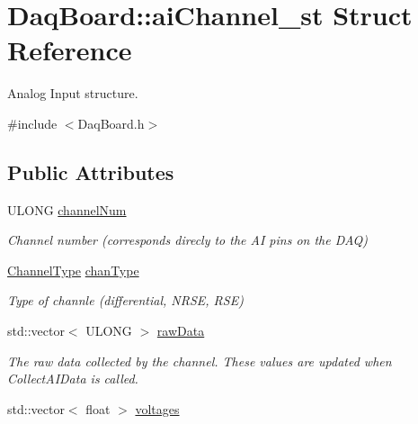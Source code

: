 \hypertarget{struct_daq_board_1_1ai_channel__st}{\section{Daq\-Board\-:\-:ai\-Channel\-\_\-st Struct Reference}
\label{struct_daq_board_1_1ai_channel__st}
}


Analog Input structure.  




{\ttfamily \#include $<$Daq\-Board.\-h$>$}

\subsection*{Public Attributes}
\begin{DoxyCompactItemize}
\item 
\hypertarget{struct_daq_board_1_1ai_channel__st_ad49169dabc4da0237e51d6b77d1844d1}{U\-L\-O\-N\-G \hyperlink{struct_daq_board_1_1ai_channel__st_ad49169dabc4da0237e51d6b77d1844d1}{channel\-Num}}\label{struct_daq_board_1_1ai_channel__st_ad49169dabc4da0237e51d6b77d1844d1}

\begin{DoxyCompactList}\small\item\em Channel number (corresponds direcly to the A\-I pins on the D\-A\-Q) \end{DoxyCompactList}\item 
\hypertarget{struct_daq_board_1_1ai_channel__st_af36dc0de3b1fd4f2cc6df835a35e8566}{\hyperlink{class_daq_board_adc04f1440c6e392e2c5da2340b9da420}{Channel\-Type} \hyperlink{struct_daq_board_1_1ai_channel__st_af36dc0de3b1fd4f2cc6df835a35e8566}{chan\-Type}}\label{struct_daq_board_1_1ai_channel__st_af36dc0de3b1fd4f2cc6df835a35e8566}

\begin{DoxyCompactList}\small\item\em Type of channle (differential, N\-R\-S\-E, R\-S\-E) \end{DoxyCompactList}\item 
\hypertarget{struct_daq_board_1_1ai_channel__st_aee08802f24ea1e0b5206ee5b89e33d3f}{std\-::vector$<$ U\-L\-O\-N\-G $>$ \hyperlink{struct_daq_board_1_1ai_channel__st_aee08802f24ea1e0b5206ee5b89e33d3f}{raw\-Data}}\label{struct_daq_board_1_1ai_channel__st_aee08802f24ea1e0b5206ee5b89e33d3f}

\begin{DoxyCompactList}\small\item\em The raw data collected by the channel. These values are updated when Collect\-A\-I\-Data is called. \end{DoxyCompactList}\item 
\hypertarget{struct_daq_board_1_1ai_channel__st_a36e5ec7d3b6b12950c5e4e078b3bd013}{std\-::vector$<$ float $>$ \hyperlink{struct_daq_board_1_1ai_channel__st_a36e5ec7d3b6b12950c5e4e078b3bd013}{voltages}}\label{struct_daq_board_1_1ai_channel__st_a36e5ec7d3b6b12950c5e4e078b3bd013}


\end{DoxyCompactItemize}
